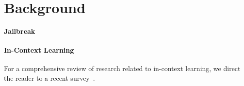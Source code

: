 \section{Background}
\paragraph{Jailbreak}
\paragraph{In-Context Learning}
For a comprehensive review of research related to in-context learning, we direct the reader to a recent survey~\citep{dong2024survey}.
